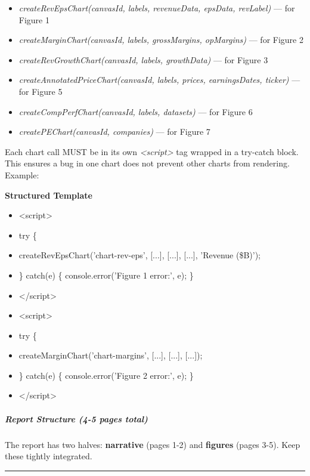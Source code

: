 \documentclass[11pt]{article}
\begin{document}
\begin{itemize}[leftmargin=*,itemsep=2pt,topsep=2pt]
\item {} \emph{createRevEpsChart(canvasId, labels, revenueData, epsData, revLabel)} — for Figure 1
\item {} \emph{createMarginChart(canvasId, labels, grossMargins, opMargins)} — for Figure 2
\item {} \emph{createRevGrowthChart(canvasId, labels, growthData)} — for Figure 3
\item {} \emph{createAnnotatedPriceChart(canvasId, labels, prices, earningsDates, ticker)} — for Figure 5
\item {} \emph{createCompPerfChart(canvasId, labels, datasets)} — for Figure 6
\item {} \emph{createPEChart(canvasId, companies)} — for Figure 7
\end{itemize}

Each chart call MUST be in its own \emph{<script>} tag wrapped in a try-catch block. This ensures a bug in one chart does not prevent other charts from rendering. Example:

\textbf{Structured Template}
\begin{itemize}[leftmargin=*,itemsep=2pt,topsep=2pt]
\item {} <script>
\item {} try \{
\item {} createRevEpsChart('chart-rev-eps', [...], [...], [...], 'Revenue (\$B)');
\item {} \} catch(e) \{ console.error('Figure 1 error:', e); \}
\item {} </script>
\item {} <script>
\item {} try \{
\item {} createMarginChart('chart-margins', [...], [...], [...]);
\item {} \} catch(e) \{ console.error('Figure 2 error:', e); \}
\item {} </script>
\end{itemize}

\subparagraph{Report Structure (4-5 pages total)}\mbox{}\par

The report has two halves: \textbf{narrative} (pages 1-2) and \textbf{figures} (pages 3-5). Keep these tightly integrated.


\vspace{0.5em}\hrule\vspace{0.5em}
\end{document}

